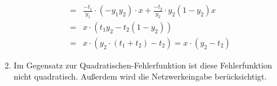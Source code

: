\documentclass[DIN, pagenumber=false, fontsize=11pt, parskip=half]{scrartcl}
\begin{document}
\begin{enumerate}
\begin{enumerate}[label=(\alph*)]
\begin{eqnarray*}
							&=& \frac{-t_1}{y_1} \cdot (-y_1 y_2) \cdot x + \frac{-t_2}{y_2} \cdot y_2(1-y_2)x \\
							&=& x \cdot (t_1 y_2 - t_2(1-y_2)) \\
							&=& x \cdot (y_2 \cdot (t_1 + t_2) - t_2) = x \cdot (y_2 - t_2)
					\end{eqnarray*}
				\item
                    Im Gegensatz zur Quadratischen-Fehlerfunktion ist diese Fehlerfunktion nicht quadratisch. Außerdem wird die Netzwerkeingabe berücksichtigt.
			\end{enumerate}
	\end{enumerate}
\end{document}
